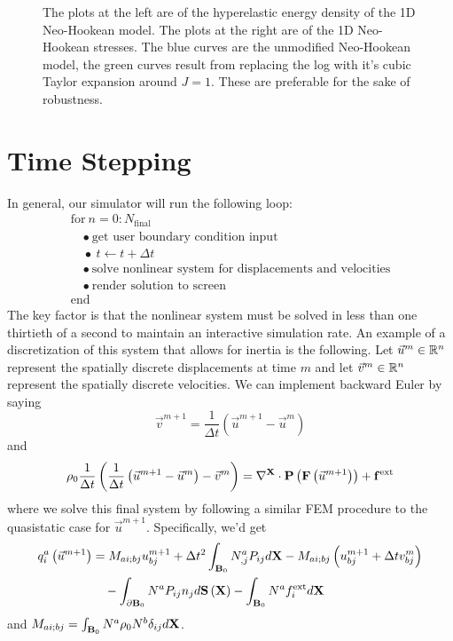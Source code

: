 \begin{figure}
\caption{The plots at the left are of the hyperelastic energy density of the 1D Neo-Hookean model. The plots at the right are of the 1D Neo-Hookean stresses. The blue curves are the unmodified Neo-Hookean model, the green curves result from replacing the log with it's cubic Taylor expansion around $J = 1$. These are preferable for the sake of robustness.}
\label{fig:inversion3}
\end{figure}

\section*{Time Stepping}

In general, our simulator will run the following loop:
\begin{equation}
\begin{array}{lc}
\text{for} \ n = 0 : N_\text{final} \\
\quad \bullet \ \text{get user boundary condition input} \\
\quad \bullet \ t \leftarrow t + \Delta{t} \\
\quad \bullet \ \text{solve nonlinear system for displacements and velocities} \\
\quad \bullet \ \text{render solution to screen}\\
\text{end}
\end{array}
\end{equation}
The key factor is that the nonlinear system must be solved in less than one thirtieth of a second to maintain an interactive simulation rate. An example of a discretization of this system that allows for inertia is the following. Let $\vec{u}^m \in \mathbb{R}^n$ represent the spatially discrete displacements at time $m$ and let $\vec{v}^m \in \mathbb{R}^n$ represent the spatially discrete velocities. We can implement backward Euler by saying
\begin{equation*}
\vec{v}^{m+1} = \frac{1}{\Delta t} \left( \vec{u}^{m+1} - \vec{u}^m \right)
\end{equation*}
and
\begin{equation*}
\rho_0 \frac{1}{\Delta t} \left( \frac{1}{\Delta t} \left( \vec{u}^{m+1} - \vec{u}^m \right) - \vec{v}^m \right) = \nabla^{\mathbf{X}} \cdot \mathbf{P} \left( \mathbf{F} \left( \vec{u}^{m+1} \right) \right) + \mathbf{f}^{\text{ext}}
\end{equation*}
where we solve this final system by following a similar FEM procedure to the quasistatic case for $\vec{u}^{m+1}$. Specifically, we'd get
\begin{align*}
q^a_i \left( \vec{u}^{m+1} \right)
& = M_{ai;bj} u^{m+1}_{bj} + \Delta t^2 \int_{\mathbf{B}_0} N^a_{,j} P_{ij} d\mathbf{X} - M_{ai;bj} \left( u^{m+1}_{bj} + \Delta{t} v^m_{bj} \right) \\
& \quad {} - \int_{\partial\mathbf{B}_0} N^a P_{ij} n_j d\mathbf{S} \left( \mathbf{X} \right) - \int_{\mathbf{B}_0} N^a f^{\text{ext}}_i d\mathbf{X}
\end{align*}
and $M_{ai;bj}=\int_{\mathbf{B}_0} N^a \rho_0 N^b \delta_{ij} d\mathbf{X}$.

